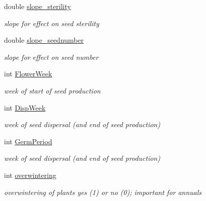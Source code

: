 \begin{DoxyCompactItemize}
double \mbox{\hyperlink{class_s_pft_traits_a9663572021811c14f9554fdc15494e14}{slope\+\_\+sterility}}
\begin{DoxyCompactList}\small\item\em slope for effect on seed sterility \end{DoxyCompactList}\item 
\mbox{\label{class_s_pft_traits_a25807de41bdb25894687d3f1f209fc79}} 
double \mbox{\hyperlink{class_s_pft_traits_a25807de41bdb25894687d3f1f209fc79}{slope\+\_\+seednumber}}
\begin{DoxyCompactList}\small\item\em slope for effect on seed number \end{DoxyCompactList}\item 
\mbox{\label{class_s_pft_traits_ad243e2e5e50ff060faaa309d725b9f6a}} 
int \mbox{\hyperlink{class_s_pft_traits_ad243e2e5e50ff060faaa309d725b9f6a}{Flower\+Week}}
\begin{DoxyCompactList}\small\item\em week of start of seed production \end{DoxyCompactList}\item 
\mbox{\label{class_s_pft_traits_a70c4556ffc078da147f2c7a977fdb396}} 
int \mbox{\hyperlink{class_s_pft_traits_a70c4556ffc078da147f2c7a977fdb396}{Disp\+Week}}
\begin{DoxyCompactList}\small\item\em week of seed dispersal (and end of seed production) \end{DoxyCompactList}\item 
\mbox{\label{class_s_pft_traits_abcc1a7d5b3099b4ab22f56daaa0a7d70}} 
int \mbox{\hyperlink{class_s_pft_traits_abcc1a7d5b3099b4ab22f56daaa0a7d70}{Germ\+Period}}
\begin{DoxyCompactList}\small\item\em week of seed dispersal (and end of seed production) \end{DoxyCompactList}\item 
\mbox{\label{class_s_pft_traits_aa223f173e18bfae737db1ede7806d56b}} 
int \mbox{\hyperlink{class_s_pft_traits_aa223f173e18bfae737db1ede7806d56b}{overwintering}}
\begin{DoxyCompactList}\small\item\em overwintering of plants yes (1) or no (0); important for annuals \end{DoxyCompactList}\item 

\end{DoxyCompactItemize}
